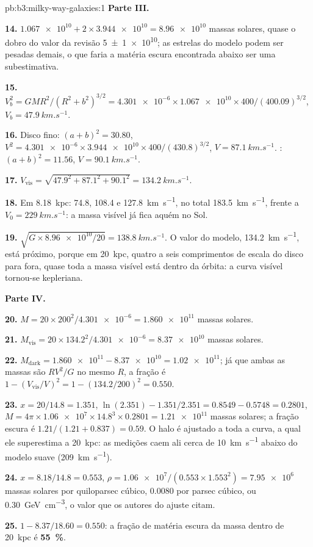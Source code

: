\begin{solution}{pb:b3:milky-way-galaxies:1}
\textbf{Parte III.}

\textbf{14.} $\num{1.067e10} + 2\times\num{3.944e10} = \num{8.96e10}$ massas
solares, quase o dobro do valor da revisão \num[separate-uncertainty=true]{5 \pm 1 e10}; as estrelas do modelo
podem ser pesadas demais, o que faria a matéria escura encontrada abaixo ser uma
subestimativa.

\textbf{15.} $V_b^2 = GMR^2/(R^2 + b^2)^{3/2} = \num{4.301e-6}\times\num{1.067e10}
\times400/(400.09)^{3/2}$, $V_b = \qty{47.9}{km.s^{-1}}$.

\textbf{16.} Disco fino: $(a + b)^2 = 30.80$, $V^2 = \num{4.301e-6}\times\num{3.944e10}
\times400/(430.8)^{3/2}$, $V = \qty{87.1}{km.s^{-1}}$. :
$(a + b)^2 = 11.56$, $V = \qty{90.1}{km.s^{-1}}$.

\textbf{17.} $V_\mathrm{vis} = \sqrt{47.9^2 + 87.1^2 + 90.1^2} =
\qty{134.2}{km.s^{-1}}$.

\textbf{18.} Em \qty{8.18}{kpc}: 74.8, 108.4 e \qty{127.8}{km.s^{-1}},
no total \qty{183.5}{km.s^{-1}}, frente a $V_0 = \qty{229}{km.s^{-1}}$:
a massa visível já fica aquém no Sol.

\textbf{19.} $\sqrt{G\times\num{8.96e10}/20} = \qty{138.8}{km.s^{-1}}$. O
valor do modelo, \qty{134.2}{km.s^{-1}}, está próximo, porque em \qty{20}{kpc},
quatro a seis comprimentos de escala do disco para fora, quase toda a massa visível está
dentro da órbita: a curva visível tornou-se kepleriana.

\textbf{Parte IV.}

\textbf{20.} $M = 20\times200^2/\num{4.301e-6} = \num{1.860e11}$ massas solares.

\textbf{21.} $M_\mathrm{vis} = 20\times134.2^2/\num{4.301e-6} = \num{8.37e10}$
massas solares.

\textbf{22.} $M_\mathrm{dark} = \num{1.860e11} - \num{8.37e10} = \num{1.02e11}$;
já que ambas as massas são $RV^2/G$ no mesmo $R$, a fração é
$1 - (V_\mathrm{vis}/V)^2 = 1 - (134.2/200)^2 = \num{0.550}$.

\textbf{23.} $x = 20/14.8 = 1.351$, $\ln(2.351) - 1.351/2.351 = 0.8549 - 0.5748
= 0.2801$, $M = 4\pi\times\num{1.06e7}\times14.8^3\times0.2801 =
\num{1.21e11}$ massas solares; a fração escura é
$1.21/(1.21 + 0.837) = \num{0.59}$. O halo é ajustado a toda
a curva, a qual ele superestima a \qty{20}{kpc}: as medições caem ali
cerca de \qty{10}{km.s^{-1}} abaixo do modelo suave (\qty{209}{km.s^{-1}}).

\textbf{24.} $x = 8.18/14.8 = 0.553$, $\rho = \num{1.06e7}/(0.553\times1.553^2)
= \num{7.95e6}$ massas solares por quiloparsec cúbico, \num{0.0080} por
parsec cúbico, ou \qty{0.30}{GeV.cm^{-3}}, o valor que os autores do
ajuste citam.

\textbf{25.} $1 - 8.37/18.60 = \num{0.550}$: a fração de matéria escura da
massa dentro de \qty{20}{kpc} é
\textbf{\qty[text-series-to-math=true]{55}{\percent}}.
\end{solution}
